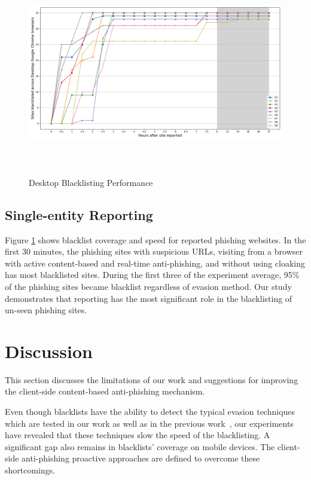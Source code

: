 \documentclass[letterpaper,twocolumn,10pt]{article}
\begin{document}
\begin{figure}[t]
  \includegraphics[width=\textwidth,height=9cm]{image (10).png}
  \caption{Desktop Blacklisting Performance}
  \label{Blacklisting speed results}
\end{figure}

\subsection{Single-entity Reporting}

Figure \ref{Blacklisting speed results} shows blacklist coverage and speed
for reported phishing websites. In the first 30 minutes, the phishing sites with suspicious URLs, visiting from a browser with active content-based and real-time anti-phishing, and without using cloaking has most blacklisted sites. During the first three of the experiment average, 95\%  of the phishing sites became blacklist regardless of evasion method.
Our study demonstrates that reporting has the most significant role in the blacklisting of un-seen phishing sites.

\section{Discussion}
This section discusses the limitations of our work and suggestions for improving the client-side content-based anti-phishing mechanism.

Even though blacklists have the ability to detect the typical evasion techniques which are tested in our work as well as in the previous work~\cite{oest2020phishtime}, our experiments have revealed that these techniques slow the speed of the blacklisting. A significant gap also remains in blacklists' coverage on mobile devices. The client-side anti-phishing proactive approaches are defined to overcome these shortcomings.
\end{document}
